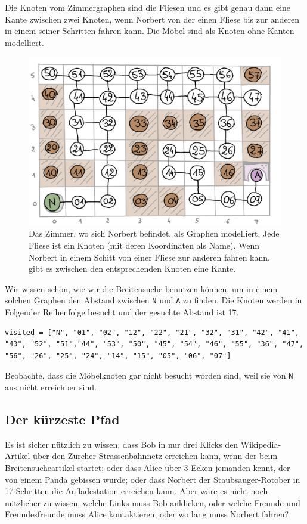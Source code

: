 Die Knoten vom Zimmergraphen sind die Fliesen und es gibt genau dann eine Kante zwischen zwei Knoten, wenn Norbert von der einen Fliese bis zur anderen in einem seiner Schritten fahren kann. Die Möbel sind als Knoten ohne Kanten modelliert.
\begin{figure}[H]
    \centering
    \includegraphics[width=\textwidth]{Pictures/SP/norbert_graph.png}
    \caption{Das Zimmer, wo sich Norbert befindet, als Graphen modelliert. Jede Fliese ist ein Knoten (mit deren Koordinaten als Name). Wenn Norbert in einem Schitt von einer Fliese zur anderen fahren kann, gibt es zwischen den entsprechenden Knoten eine Kante.}
    \label{fig:norbert_graph}
\end{figure}
Wir wissen schon, wie wir die Breitensuche benutzen können, um in einem solchen Graphen den Abstand zwischen \texttt{N} und \texttt{A} zu finden.
Die Knoten werden in Folgender Reihenfolge besucht und der gesuchte Abstand ist 17.
\begin{lstlisting}
visited = ["N", "01", "02", "12", "22", "21", "32", "31", "42", "41", "43", "52", "51","44", "53", "50", "45", "54", "46", "55", "36", "47", "56", "26", "25", "24", "14", "15", "05", "06", "07"]
\end{lstlisting}
Beobachte, dass die Möbelknoten gar nicht besucht worden sind, weil sie von \texttt{N} aus nicht erreichber sind.

\subsection{Der kürzeste Pfad}
Es ist sicher nützlich zu wissen, dass Bob in nur drei Klicks den Wikipedia-Artikel über den Zürcher Strassenbahnnetz erreichen kann, wenn der beim Breitensucheartikel startet; oder dass Alice über 3 Ecken jemanden kennt, der von einem Panda gebissen wurde; oder dass Norbert der Staubsauger-Rotober in 17 Schritten die Aufladestation erreichen kann. Aber wäre es nicht noch nützlicher zu wissen, welche Links muss Bob anklicken, oder welche Freunde und Freundesfreunde muss Alice kontaktieren, oder wo lang muss Norbert fahren?

